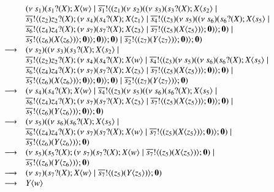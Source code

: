 \[
\begin{array}{ll}
	& (\nu\ s_1)( s_1 ? (X) ; X\langle w \rangle \;|\; \overline{s_1} ! \langle (z_1)(\nu\ s_2)((\nu\ s_3)( s_3 ? (X) ; X\langle s_2 \rangle \;|\; \\
	& \overline{s_3} ! \langle (z_2)z_2 ? (X) ; (\nu\ s_4)( s_4 ? (X) ; X\langle z_1 \rangle \;|\; \overline{s_4} ! \langle (z_3)(\nu\ s_5)( (\nu\ s_6)( s_6 ? (X) ; X\langle s_5 \rangle \;|\; \\
	& \overline{s_6} ! \langle (z_4)z_4 ? (X) ; (\nu\ s_7)( s_7 ? (X) ; X\langle z_3 \rangle \;|\; \overline{s_7} ! \langle (z_5)(X\langle z_5 \rangle) \rangle ; \mathbf{0}) \rangle ; \mathbf{0}) \;|\;\\
	&\overline{s_5} ! \langle (z_6)(X\langle z_6 \rangle) \rangle ; \mathbf{0} ) \rangle ; \mathbf{0}) \rangle ; \mathbf{0}) \;|\; \overline{s_2} ! \langle (z_7)(Y\langle z_7 \rangle) \rangle ;\mathbf{0} ) \rangle ; \mathbf{0})\\

	\longrightarrow &
	(\nu\ s_2)((\nu\ s_3)( s_3 ? (X) ; X\langle s_2 \rangle \;|\; \\
	& \overline{s_3} ! \langle (z_2)z_2 ? (X) ; (\nu\ s_4)( s_4 ? (X) ; X\langle w \rangle \;|\; \overline{s_4} ! \langle (z_3)(\nu\ s_5)( (\nu\ s_6)( s_6 ? (X) ; X\langle s_5 \rangle \;|\; \\
	& \overline{s_6} ! \langle (z_4)z_4 ? (X) ; (\nu\ s_7)( s_7 ? (X) ; X\langle z_3 \rangle \;|\; \overline{s_7} ! \langle (z_5)(X\langle z_5 \rangle) \rangle ; \mathbf{0}) \rangle ; \mathbf{0}) \;|\;\\
	&\overline{s_5} ! \langle (z_6)(X\langle z_6 \rangle) \rangle ; \mathbf{0} ) \rangle ; \mathbf{0}) \rangle ; \mathbf{0}) \;|\; \overline{s_2} ! \langle (z_7)(Y\langle z_7 \rangle) \rangle ;\mathbf{0} )\\

	\longrightarrow & (\nu\ s_4)(s_4 ? (X) ; X\langle w \rangle \;|\; \overline{s_4} ! \langle  (z_3)(\nu\ s_5)((\nu\ s_6)( s_6 ? (X) ; X\langle s_5 \rangle \;|\; \\
	& \overline{s_6} ! \langle (z_4)z_4 ? (X) ; (\nu\ s_7)( s_7 ? (X) ; X\langle z_3 \rangle \;|\;\overline{s_7} ! \langle (z_5)(X\langle z_5 \rangle) \rangle ; \mathbf{0}) \rangle ; \mathbf{0}) \;|\;\\
	& \overline{s_5} ! \langle (z_6)(Y\langle z_6 \rangle) \rangle ; \mathbf{0} ) \rangle ; \mathbf{0})\\

	\longrightarrow & (\nu\ s_5)((\nu\ s_6)( s_6 ? (X) ; X\langle s_5 \rangle \;|\; \\
	& \overline{s_6} ! \langle (z_4)z_4 ? (X) ; (\nu\ s_7)( s_7 ? (X) ; X\langle w \rangle \;|\;\overline{s_7} ! \langle (z_5)(X\langle z_5 \rangle) \rangle ; \mathbf{0}) \rangle ; \mathbf{0}) \;|\;\\
	& \overline{s_5} ! \langle (z_6)(Y\langle z_6 \rangle) \rangle ; \mathbf{0} )\\

	\longrightarrow & (\nu\ s_5)(s_5 ? (X) ; (\nu\ s_7)( s_7 ? (X) ; X\langle w \rangle \;|\;\overline{s_7} ! \langle (z_5)(X\langle z_5 \rangle) \rangle ; \mathbf{0}) \;|\;\\
	& \overline{s_5} ! \langle (z_6)(Y\langle z_6 \rangle) \rangle ; \mathbf{0} )\\

	\longrightarrow & (\nu\ s_7)( s_7 ? (X) ; X\langle w \rangle \;|\;\overline{s_7} ! \langle (z_5)(Y\langle z_5 \rangle) \rangle ; \mathbf{0})\\

	\longrightarrow & Y\langle w \rangle
\end{array}
\]

